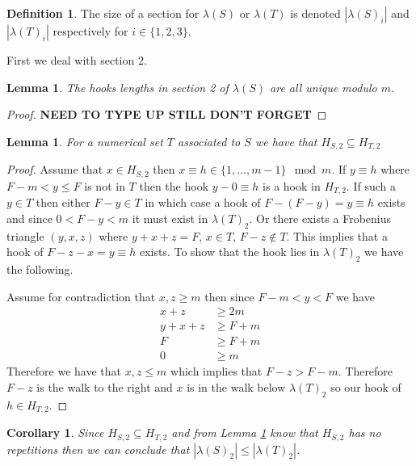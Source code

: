 \documentclass[11pt,letterpaper]{article}
\newtheorem{lem}[thm]{Lemma}
\newtheorem{cor}[thm]{Corollary}
\theoremstyle{definition}
\newtheorem{defn}[thm]{Definition}
\begin{document}
\begin{defn}
    The size of a section for $\lambda(S)$ or $\lambda(T)$ is denoted $|\lambda(S)_i|$ and $|\lambda(T)_i|$ respectively for $i\in\{1,2,3\}$.
\end{defn}


First we deal with section 2.


\begin{lem}
    \label{hooks sec 2}
    The hooks lengths in section 2 of $\lambda(S)$ are all unique modulo $m$.
\end{lem}

\begin{proof}
    \textbf{NEED TO TYPE UP STILL DON'T FORGET}
\end{proof}




\begin{lem}
    \label{subset section 2}
    For a numerical set $T$ associated to $S$ we have that $H_{S,2}\subseteq H_{T,2}$
\end{lem}

\begin{proof}
    Assume that $x\in H_{S,2}$ then $x\equiv h\in\{1,...,m-1\}\mod m$. If $y\equiv h$ where $F-m<y\leq F$ is not in $T$ then the hook $y-0\equiv h$ is a hook in $H_{T,2}$. If such a $y\in T$ then either $F-y\in T$ in which case a hook of $F-(F-y)=y\equiv h$ exists and since $0<F-y<m$ it must exist in $\lambda(T)_2$. Or there exists a Frobenius triangle $(y,x,z)$ where $y+x+z=F$, $x\in T$, $F-z\notin T$. This implies that a hook of $F-z-x=y\equiv h$ exists. To show that the hook lies in $\lambda(T)_2$ we have the following.

    Assume for contradiction that $x,z\geq m$ then since $F-m<y<F$ we have
    \begin{align*}
        x+z&\geq 2m\\
        y+x+z&\geq F+m\\
        F&\geq F+m\\
        0&\geq m
    \end{align*}
    Therefore we have that $x,z\leq m$ which implies that $F-z>F-m$. Therefore $F-z$ is the walk to the right and $x$ is in the walk below $\lambda(T)_2$ so our hook of $h\in H_{T,2}$.
\end{proof}




\begin{cor}
    \label{Section 2 size}
    Since $H_{S,2}\subseteq H_{T,2}$ and from Lemma \ref{hooks sec 2} know that $H_{S,2}$ has no repetitions then we can conclude that $|\lambda(S)_2|\leq |\lambda(T)_2|$.
\end{cor}
\end{document}

